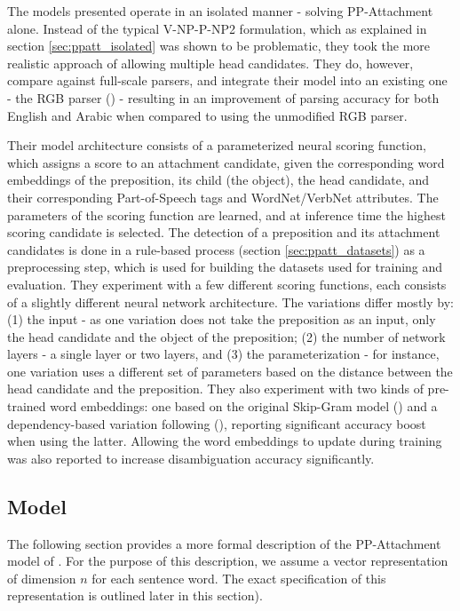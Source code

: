 The models presented operate in an isolated manner - solving PP-Attachment alone. Instead of the typical V-NP-P-NP2 formulation, which as explained in section \ref{sec:ppatt_isolated} was shown to be problematic, they took the more realistic approach of allowing multiple head candidates. They do, however, compare against full-scale parsers, and integrate their model into an existing one - the RGB parser (\cite{lei-etal-14-low}) - resulting in an improvement of parsing accuracy for both English and Arabic when compared to using the unmodified RGB parser.

Their model architecture consists of a parameterized neural scoring function, which assigns a score to an attachment candidate, given the corresponding word embeddings of the preposition, its child (the object), the head candidate, and their corresponding Part-of-Speech tags and WordNet/VerbNet attributes. The parameters of the scoring function are learned, and at inference time the highest scoring candidate is selected. The detection of a preposition and its attachment candidates is done in a rule-based process (section \ref{sec:ppatt_datasets}) as a preprocessing step, which is used for building the datasets used for training and evaluation. They experiment with a few different scoring functions, each consists of a slightly different neural network architecture. The variations differ mostly by: (1)  the input - as one variation does not take the preposition as an input, only the head candidate and the object of the preposition; (2) the number of network layers - a single layer or two layers, and (3) the parameterization - for instance, one variation uses a different set of parameters based on the distance between the head candidate and the preposition. They also experiment with two kinds of pre-trained word embeddings: one based on the original Skip-Gram model (\cite{word2vec}) and a dependency-based variation following (\cite{bansal}), reporting significant accuracy boost when using the latter. Allowing the word embeddings to update during training was also reported to increase disambiguation accuracy significantly. 

\subsection{Model}
The following section provides a more formal description of the PP-Attachment model of \cite{hpcd}. For the purpose of this description, we assume a vector representation of dimension $n$ for each sentence word. The exact specification of this representation is outlined later in this section).

